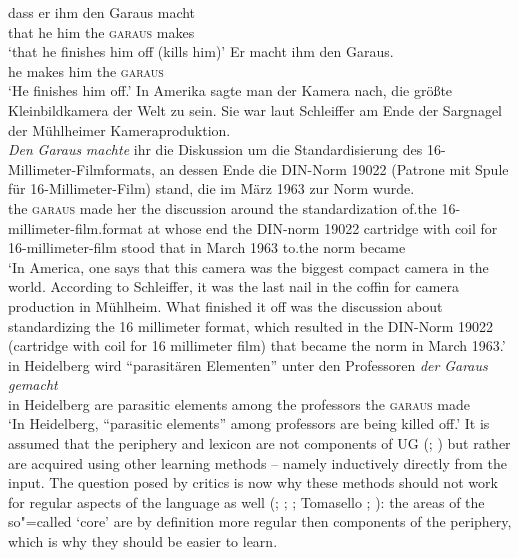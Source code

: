 \addlines
\eal
\ex 
\gll dass er ihm den Garaus macht\\
	 that he him the \textsc{garaus} makes\\
\glt `that he finishes him off (kills him)'
\ex 
\gll Er macht ihm den Garaus.\\
	 he makes him the \textsc{garaus}\\
\glt `He finishes him off.'
\ex
In Amerika sagte man der Kamera nach, die größte Kleinbildkamera der Welt zu sein. Sie war laut
Schleiffer am Ende der Sargnagel der Mühlheimer Kameraproduktion.\\
\gll 
\emph{Den} \emph{Garaus} \emph{machte} ihr die Diskussion um die Standardisierung des 16-Millimeter-Filmformats,
an dessen Ende die DIN-Norm 19022 (Patrone mit Spule für 16-Millimeter-Film) stand, die im März 1963
zur Norm wurde.\footnotemark\\
the \textsc{garaus} made her
the discussion around the standardization of.the 16-millimeter-film.format at whose end the DIN-norm 19022
\spacebr{}cartridge with coil for 16-millimeter-film stood that in March 1963 to.the norm
became\\
\glt `In America, one says that this camera was the biggest compact camera in the world. According to Schleiffer, it was the
last nail in the coffin for camera production in Mühlheim. What finished it off was the discussion about standardizing
the 16 millimeter format, which resulted in the DIN-Norm 19022 (cartridge with coil for 16 millimeter film) that became
the norm in March 1963.'
\ex
\gll in Heidelberg wird "`parasitären Elementen"' unter den Professoren \emph{der} \emph{Garaus} \emph{gemacht}\footnotemark\\
	 in Heidelberg are parasitic elements among the professors the \textsc{garaus} made\\
\glt `In Heidelberg, ``parasitic elements'' among professors are being killed off.'
\zl
\noindent
It is assumed that the periphery and lexicon are not components of UG (\citealp[--151]{Chomsky86}; \citealp[]{Fodor98a})
but rather are acquired using other learning methods -- namely inductively directly from the input. The question posed by critics is now why these methods should not work for regular aspects of the language as well (\citealp[]{Abney96a}; 
\citealp[]{Goldberg2003b}; \citealp[]{Newmeyer2005a}; Tomasello \citeyear[]{Tomasello2006a}; \citeyear[]{Tomasello2006c}): the areas of the so"=called `core' are by definition more regular then components of the periphery, which is why
they should be easier to learn.

